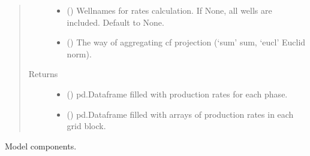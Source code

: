 \documentclass[letterpaper,10pt,english]{sphinxmanual}
\begin{document}
\begin{fulllineitems}
\begin{fulllineitems}
\begin{quote}
\begin{description}
\begin{itemize}
\item {} 
 () \textendash{} Wellnames for rates calculation. If None, all wells are included. Default to None.

\item {} 
 (\sphinxstyleliteralemphasis{\sphinxupquote{, }}) \textendash{} The way of aggregating cf projection (‘sum’ \sphinxhyphen{} sum, ‘eucl’ \sphinxhyphen{} Euclid norm).

\end{itemize}

\item[{Returns}] \leavevmode
\begin{itemize}
\item {} 
 () \textendash{} pd.Dataframe filled with production rates for each phase.

\item {} 
 () \textendash{} pd.Dataframe filled with arrays of production rates in each grid block.

\end{itemize}


\end{description}\end{quote}

\end{fulllineitems}


\begin{fulllineitems}
\label{\detokenize{api/field:geology.src.Field.components}}
Model components.

\end{fulllineitems}



\end{fulllineitems}
\end{document}
